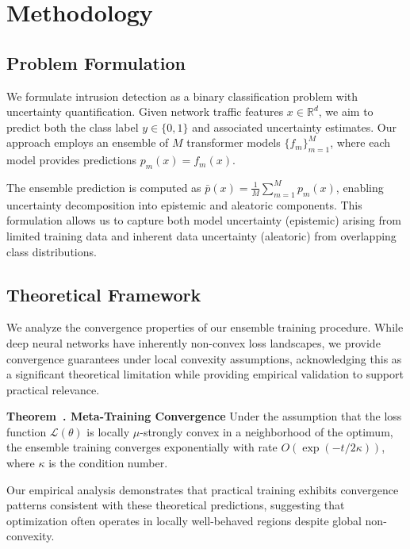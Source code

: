 \documentclass[journal]{IEEEtran}
\newcounter{theorem}
\newenvironment{theorem}[1][]{\refstepcounter{theorem}\par\medskip
   \noindent \textbf{Theorem~\thetheorem. #1} \rmfamily}{\medskip}
\begin{document}
\section{Methodology}

\subsection{Problem Formulation}

We formulate intrusion detection as a binary classification problem with uncertainty quantification. Given network traffic features $x \in \mathbb{R}^d$, we aim to predict both the class label $y \in \{0,1\}$ and associated uncertainty estimates. Our approach employs an ensemble of $M$ transformer models $\{f_m\}_{m=1}^M$, where each model provides predictions $p_m(x) = f_m(x)$.

The ensemble prediction is computed as $\bar{p}(x) = \frac{1}{M} \sum_{m=1}^M p_m(x)$, enabling uncertainty decomposition into epistemic and aleatoric components. This formulation allows us to capture both model uncertainty (epistemic) arising from limited training data and inherent data uncertainty (aleatoric) from overlapping class distributions.

\subsection{Theoretical Framework}

We analyze the convergence properties of our ensemble training procedure. While deep neural networks have inherently non-convex loss landscapes, we provide convergence guarantees under local convexity assumptions, acknowledging this as a significant theoretical limitation while providing empirical validation to support practical relevance.

\begin{theorem}[Meta-Training Convergence]
Under the assumption that the loss function $\mathcal{L}(\theta)$ is locally $\mu$-strongly convex in a neighborhood of the optimum, the ensemble training converges exponentially with rate $O(\exp(-t/2\kappa))$, where $\kappa$ is the condition number.
\end{theorem}

Our empirical analysis demonstrates that practical training exhibits convergence patterns consistent with these theoretical predictions, suggesting that optimization often operates in locally well-behaved regions despite global non-convexity.
\end{document}
